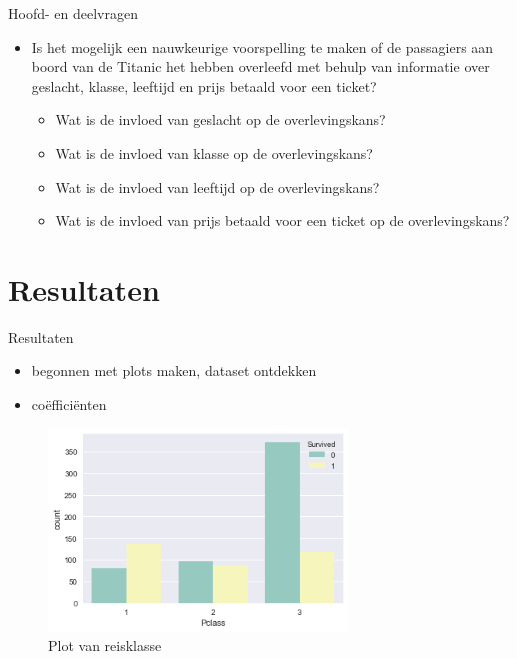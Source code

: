 \documentclass[presentation]{beamer}
\begin{document}
\begin{frame}[label={sec:org75bd861}]{Hoofd- en deelvragen}
\begin{itemize}
\item Is het mogelijk een nauwkeurige voorspelling te maken of de passagiers aan boord van de Titanic het hebben overleefd met behulp van informatie over geslacht, klasse, leeftijd en prijs betaald voor een ticket? 
\begin{itemize}
\item Wat is de invloed van geslacht op de overlevingskans?
\item Wat is de invloed van klasse op de overlevingskans?
\item Wat is de invloed van leeftijd op de overlevingskans?
\item Wat is de invloed van prijs betaald voor een ticket op de overlevingskans?
\end{itemize}
\end{itemize}
\end{frame}


\section*{Resultaten}
\label{sec:orgc4bd0cc}

\begin{frame}[label={sec:org03cb064}]{Resultaten}
\begin{itemize}
\item begonnen met plots maken, dataset ontdekken
\item coëfficiënten
\end{itemize}

\begin{figure}[htbp]
\centering
\includegraphics[width=300]{./ClassCount.png}
\caption{Plot van reisklasse}
\end{figure}
\end{frame}
\end{document}
